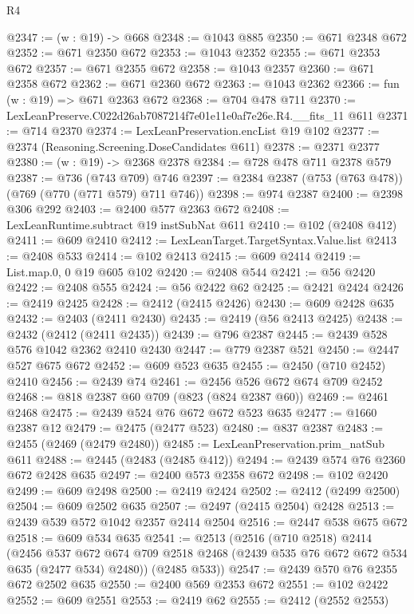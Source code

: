 \begin{lexlean}{R4}
\begin{coremodule}
@2347 := (w : @19) -> @668
@2348 := @1043 @885
@2350 := @671 @2348 @672
@2352 := @671 @2350 @672
@2353 := @1043 @2352
@2355 := @671 @2353 @672
@2357 := @671 @2355 @672
@2358 := @1043 @2357
@2360 := @671 @2358 @672
@2362 := @671 @2360 @672
@2363 := @1043 @2362
@2366 := fun (w : @19) => @671 @2363 @672
@2368 := @704 @478 @711
@2370 := LexLeanPreserve.C022d26ab7087214f7e01e11e0af7e26e.R4.__fits_11 @611
@2371 := @714 @2370
@2374 := LexLeanPreservation.encList @19 @102
@2377 := @2374 (Reasoning.Screening.DoseCandidates @611)
@2378 := @2371 @2377
@2380 := (w : @19) -> @2368 @2378
@2384 := @728 @478 @711 @2378 @579
@2387 := @736 (@743 @709) @746
@2397 := @2384 @2387 (@753 (@763 @478)) (@769 (@770 (@771 @579) @711 @746))
@2398 := @974 @2387
@2400 := @2398 @306 @292
@2403 := @2400 @577 @2363 @672
@2408 := LexLeanRuntime.subtract @19 instSubNat @611
@2410 := @102 (@2408 @412)
@2411 := @609 @2410
@2412 := LexLeanTarget.TargetSyntax.Value.list
@2413 := @2408 @533
@2414 := @102 @2413
@2415 := @609 @2414
@2419 := List.map.{0, 0} @19 @605 @102
@2420 := @2408 @544
@2421 := @56 @2420
@2422 := @2408 @555
@2424 := @56 @2422 @62
@2425 := @2421 @2424
@2426 := @2419 @2425
@2428 := @2412 (@2415 @2426)
@2430 := @609 @2428 @635
@2432 := @2403 (@2411 @2430)
@2435 := @2419 (@56 @2413 @2425)
@2438 := @2432 (@2412 (@2411 @2435))
@2439 := @796 @2387
@2445 := @2439 @528 @576 @1042 @2362 @2410 @2430
@2447 := @779 @2387 @521
@2450 := @2447 @527 @675 @672
@2452 := @609 @523 @635
@2455 := @2450 (@710 @2452) @2410
@2456 := @2439 @74
@2461 := @2456 @526 @672 @674 @709 @2452
@2468 := @818 @2387 @60 @709 (@823 (@824 @2387 @60))
@2469 := @2461 @2468
@2475 := @2439 @524 @76 @672 @672 @523 @635
@2477 := @1660 @2387 @12
@2479 := @2475 (@2477 @523)
@2480 := @837 @2387
@2483 := @2455 (@2469 (@2479 @2480))
@2485 := LexLeanPreservation.prim_natSub @611
@2488 := @2445 (@2483 (@2485 @412))
@2494 := @2439 @574 @76 @2360 @672 @2428 @635
@2497 := @2400 @573 @2358 @672
@2498 := @102 @2420
@2499 := @609 @2498
@2500 := @2419 @2424
@2502 := @2412 (@2499 @2500)
@2504 := @609 @2502 @635
@2507 := @2497 (@2415 @2504) @2428
@2513 := @2439 @539 @572 @1042 @2357 @2414 @2504
@2516 := @2447 @538 @675 @672
@2518 := @609 @534 @635
@2541 := @2513
    (@2516
      (@710 @2518)
      @2414
      (@2456
        @537
        @672
        @674
        @709
        @2518
        @2468
        (@2439 @535 @76 @672 @672 @534 @635 (@2477 @534) @2480))
      (@2485 @533))
@2547 := @2439 @570 @76 @2355 @672 @2502 @635
@2550 := @2400 @569 @2353 @672
@2551 := @102 @2422
@2552 := @609 @2551
@2553 := @2419 @62
@2555 := @2412 (@2552 @2553)

\end{coremodule}
\end{lexlean}
